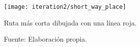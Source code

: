 
\begin{figure}[H]
  \begin{center}
    \texttt{[image: iteration2/short\_way\_place]}
    \caption{Ruta más corta dibujada con una línea roja.}
    \label{fig:short_way_place}
    \caption*{Fuente: Elaboración propia.}
  \end{center}
\end{figure}



